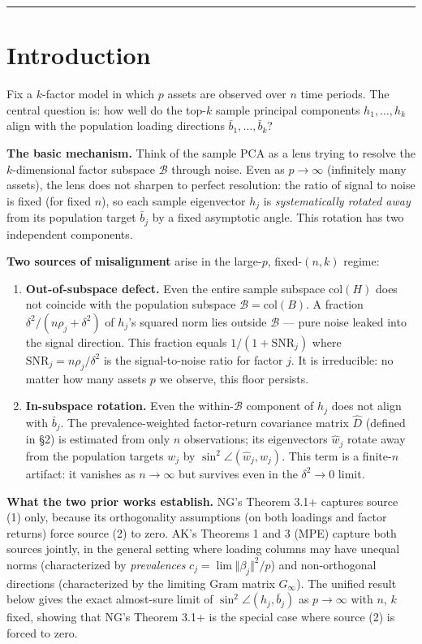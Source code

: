 \documentclass{article}
\theoremstyle{remark}
\begin{document}
\medskip\noindent\rule{\linewidth}{0.4pt}\medskip

\section{Introduction}

Fix a $k$-factor model in which $p$ assets are observed over $n$ time periods. The central question is: how well do the top-$k$ sample principal components $h_1,\ldots,h_k$ align with the population loading directions $\bar{b}_1,\ldots,\bar{b}_k$?

\textbf{The basic mechanism.} Think of the sample PCA as a lens trying to resolve the $k$-dimensional factor subspace $\mathcal{B}$ through noise. Even as $p\to\infty$ (infinitely many assets), the lens does not sharpen to perfect resolution: the ratio of signal to noise is fixed (for fixed $n$), so each sample eigenvector $h_j$ is \textit{systematically rotated away} from its population target $\bar{b}_j$ by a fixed asymptotic angle. This rotation has two independent components.

\textbf{Two sources of misalignment} arise in the large-$p$, fixed-$(n,k)$ regime:

\begin{enumerate}
\item \textbf{Out-of-subspace defect.} Even the entire sample subspace $\mathrm{col}(H)$ does not coincide with the population subspace $\mathcal{B} = \mathrm{col}(B)$. A fraction $\delta^2/(n\rho_j + \delta^2)$ of $h_j$'s squared norm lies outside $\mathcal{B}$ — pure noise leaked into the signal direction. This fraction equals $1/(1+\mathrm{SNR}_j)$ where $\mathrm{SNR}_j = n\rho_j/\delta^2$ is the signal-to-noise ratio for factor $j$. It is irreducible: no matter how many assets $p$ we observe, this floor persists.

\item \textbf{In-subspace rotation.} Even the within-$\mathcal{B}$ component of $h_j$ does not align with $\bar{b}_j$. The prevalence-weighted factor-return covariance matrix $\hat{D}$ (defined in §2) is estimated from only $n$ observations; its eigenvectors $\hat{w}_j$ rotate away from the population targets $w_j$ by $\sin^2\angle(\hat{w}_j, w_j)$. This term is a finite-$n$ artifact: it vanishes as $n\to\infty$ but survives even in the $\delta^2\to 0$ limit.

\end{enumerate}
\textbf{What the two prior works establish.} NG's Theorem 3.1+ captures source (1) only, because its orthogonality assumptions (on both loadings and factor returns) force source (2) to zero. AK's Theorems 1 and 3 (MPE) capture both sources jointly, in the general setting where loading columns may have unequal norms (characterized by \textit{prevalences} $c_j = \lim\Vert \beta_j\Vert^2/p$) and non-orthogonal directions (characterized by the limiting Gram matrix $G_\infty$). The unified result below gives the exact almost-sure limit of $\sin^2\angle(h_j, \bar{b}_j)$ as $p\to\infty$ with $n$, $k$ fixed, showing that NG's Theorem 3.1+ is the special case where source (2) is forced to zero.
\end{document}
